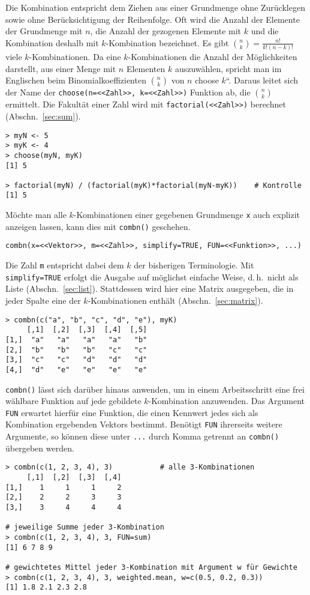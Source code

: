 Die Kombination entspricht dem Ziehen aus einer Grundmenge ohne Zurücklegen sowie ohne Berücksichtigung der Reihenfolge. Oft wird die Anzahl der Elemente der Grundmenge mit $n$, die Anzahl der gezogenen Elemente mit $k$ und die Kombination deshalb mit $k$-Kombination bezeichnet. Es gibt ${n \choose k} = \frac{n!}{k! (n-k)!}$ viele $k$-Kombinationen. Da eine $k$-Kombinationen die Anzahl der Möglichkeiten darstellt, aus einer Menge mit $n$ Elementen $k$ auszuwählen, spricht man im Englischen beim Binomialkoeffizienten ${n \choose k}$ von {\quotedblbase}$n$ choose $k${\textquotedblleft}. Daraus leitet sich der Name der \lstinline!choose(n=<<Zahl>>, k=<<Zahl>>)! Funktion ab, die ${n \choose k}$ ermittelt. Die Fakultät einer Zahl wird mit \lstinline!factorial(<<Zahl>>)! berechnet (Abschn.\ \ref{sec:sum}).
\begin{lstlisting}
> myN <- 5
> myK <- 4
> choose(myN, myK)
[1] 5

> factorial(myN) / (factorial(myK)*factorial(myN-myK))    # Kontrolle
[1] 5
\end{lstlisting}

Möchte man alle $k$-Kombinationen einer gegebenen Grundmenge \lstinline!x! auch explizit anzeigen lassen, kann dies mit \lstinline!combn()! geschehen.
\begin{lstlisting}
combn(x=<<Vektor>>, m=<<Zahl>>, simplify=TRUE, FUN=<<Funktion>>, ...)
\end{lstlisting}

Die Zahl \lstinline!m! entspricht dabei dem $k$ der bisherigen Terminologie. Mit \lstinline!simplify=TRUE! erfolgt die Ausgabe auf möglichst einfache Weise, d.\,h.\ nicht als Liste (Abschn.\ \ref{sec:list}). Stattdessen wird hier eine Matrix ausgegeben, die in jeder Spalte eine der $k$-Kombinationen enthält (Abschn.\ \ref{sec:matrix}).
\begin{lstlisting}
> combn(c("a", "b", "c", "d", "e"), myK)
     [,1]  [,2]  [,3]  [,4]  [,5]
[1,]  "a"   "a"   "a"   "a"   "b"
[2,]  "b"   "b"   "b"   "c"   "c"
[3,]  "c"   "c"   "d"   "d"   "d"
[4,]  "d"   "e"   "e"   "e"   "e"
\end{lstlisting}

\lstinline!combn()! lässt sich darüber hinaus anwenden, um in einem Arbeitsschritt eine frei wählbare Funktion auf jede gebildete $k$-Kombination anzuwenden. Das Argument \lstinline!FUN! erwartet hierfür eine Funktion, die einen Kennwert jedes sich als Kombination ergebenden Vektors bestimmt. Benötigt \lstinline!FUN! ihrerseits weitere Argumente, so können diese unter \lstinline!...! durch Komma getrennt an \lstinline!combn()! übergeben werden.
\begin{lstlisting}
> combn(c(1, 2, 3, 4), 3)           # alle 3-Kombinationen
     [,1]  [,2]  [,3]  [,4]
[1,]    1     1     1     2
[2,]    2     2     3     3
[3,]    3     4     4     4

# jeweilige Summe jeder 3-Kombination
> combn(c(1, 2, 3, 4), 3, FUN=sum)
[1] 6 7 8 9

# gewichtetes Mittel jeder 3-Kombination mit Argument w für Gewichte
> combn(c(1, 2, 3, 4), 3, weighted.mean, w=c(0.5, 0.2, 0.3))
[1] 1.8 2.1 2.3 2.8
\end{lstlisting}

